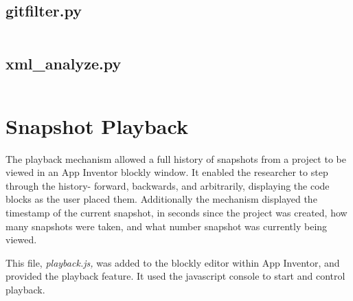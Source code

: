 \subsection{gitfilter.py}
\inputminted[lastline=168]{python}{src/analysis/gitfilter.py}
\subsection{xml\_analyze.py}
\inputminted[lastline=261]{python}{src/analysis/xml_analyze.py}


\section{Snapshot Playback}
The playback mechanism allowed a full history of snapshots from a project to be viewed in an App Inventor blockly window. It enabled the researcher to step through the history- forward, backwards, and arbitrarily, displaying the code blocks as the user placed them. Additionally the mechanism displayed the timestamp of the current snapshot, in seconds since the project was created, how many snapshots were taken, and what number snapshot was currently being viewed.

This file, \emph{playback.js,} was added to the blockly editor within App Inventor, and provided the playback feature. It used the javascript console to start and control playback.
\label{src:playback.js}
\inputminted{javascript}{src/playback/playback.js}

